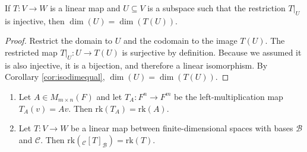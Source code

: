 \documentclass[../linear_algebra_and_groups.tex]{subfiles}
\begin{document}
\begin{lemma}
\label{lem:dimrestriction}
    \begin{shaded*}
        If $T:V\to W$ is a linear map and $U\subseteq V$ is a subspace such that the restriction $T|_U$ is injective, then $\dim(U) = \dim(T(U))$.
    \end{shaded*}
\end{lemma}
\begin{proof}
    Restrict the domain to $U$ and the codomain to the image $T(U)$. The restricted map $T|_U : U \to T(U)$ is surjective by definition. Because we assumed it is also injective, it is a bijection, and therefore a linear isomorphism. By Corollary \ref{cor:isodimequal}, $\dim(U)=\dim(T(U))$.\qedhere
\end{proof}

\begin{proposition}
    \begin{shaded*}
        \begin{enumerate}
            \item Let $A\in M_{m\times n}(F)$ and let $T_A:F^n\to F^m$ be the left-multiplication map $T_A(v)=Av$. Then $\mathrm{rk}(T_A) = \mathrm{rk}(A)$.
            \item Let $T:V\to W$ be a linear map between finite-dimensional spaces with bases $\mathcal{B}$ and $\mathcal{C}$. Then $\mathrm{rk}({}_\mathcal{C}[T]_\mathcal{B}) = \mathrm{rk}(T)$.
        \end{enumerate}
    \end{shaded*}
\end{proposition}
\end{document}
